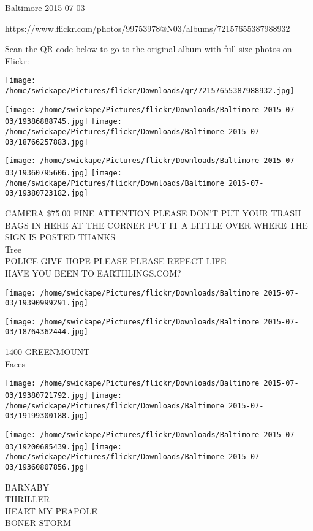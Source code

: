 \documentclass[10pt,letterpaper]{article}
\begin{document}
Baltimore 2015-07-03

https://www.flickr.com/photos/99753978@N03/albums/72157655387988932

Scan the QR code below to go to the original album with full-size photos on Flickr:

\texttt{[image: /home/swickape/Pictures/flickr/Downloads/qr/72157655387988932.jpg]}
\pagebreak

\texttt{[image: /home/swickape/Pictures/flickr/Downloads/Baltimore 2015-07-03/19386888745.jpg]}
\texttt{[image: /home/swickape/Pictures/flickr/Downloads/Baltimore 2015-07-03/18766257883.jpg]}

\texttt{[image: /home/swickape/Pictures/flickr/Downloads/Baltimore 2015-07-03/19360795606.jpg]}
\texttt{[image: /home/swickape/Pictures/flickr/Downloads/Baltimore 2015-07-03/19380723182.jpg]}

CAMERA \$75.00 FINE ATTENTION PLEASE DON'T PUT YOUR TRASH BAGS IN HERE AT THE CORNER PUT IT A LITTLE OVER WHERE THE SIGN IS POSTED THANKS\\
Tree\\
POLICE GIVE HOPE PLEASE PLEASE REPECT LIFE\\
HAVE YOU BEEN TO EARTHLINGS.COM?
\pagebreak

\texttt{[image: /home/swickape/Pictures/flickr/Downloads/Baltimore 2015-07-03/19390999291.jpg]}

\vspace{0.25in}
\texttt{[image: /home/swickape/Pictures/flickr/Downloads/Baltimore 2015-07-03/18764362444.jpg]}

1400 GREENMOUNT\\
Faces
\pagebreak

\texttt{[image: /home/swickape/Pictures/flickr/Downloads/Baltimore 2015-07-03/19380721792.jpg]}
\texttt{[image: /home/swickape/Pictures/flickr/Downloads/Baltimore 2015-07-03/19199300188.jpg]}

\texttt{[image: /home/swickape/Pictures/flickr/Downloads/Baltimore 2015-07-03/19200685439.jpg]}
\texttt{[image: /home/swickape/Pictures/flickr/Downloads/Baltimore 2015-07-03/19360807856.jpg]}

BARNABY\\
THRILLER\\
HEART MY PEAPOLE\\
BONER STORM
\pagebreak
\end{document}

